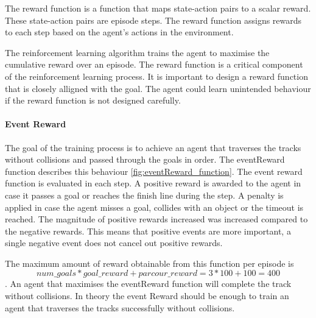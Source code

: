 The reward function is a function that maps state-action pairs to a scalar reward. These state-action pairs are episode steps. The reward function assigns rewards to each step based on the agent's actions in the environment.

The reinforcement learning algorithm trains the agent to maximise the cumulative reward over an episode. The reward function is a critical component of the reinforcement learning process. It is important to design a reward function that is closely alligned with the goal. The agent could learn unintended behaviour if the reward function is not designed carefully.

\paragraph*{Event Reward}
The goal of the training process is to achieve an agent that traverses the tracks without collisions and passed through the goals in order. The eventReward function describes this behaviour \ref{fig:eventReward_function}. The event reward function is evaluated in each step. A positive reward is awarded to the agent in case it passes a goal or reaches the finish line during the step. A penalty is applied in case the agent misses a goal, collides with an object or the timeout is reached. The magnitude of positive rewards increased was increased compared to the negative rewards. This means that positive events are more important, a single negative event does not cancel out positive rewards.

The maximum amount of reward obtainable from this function per episode is \[num\_goals * goal\_reward + parcour\_reward = 3 * 100 + 100 = 400\]. An agent that maximises the eventReward function will complete the track without collisions. In theory the event Reward should be enough to train an agent that traverses the tracks successfully without collisions.


